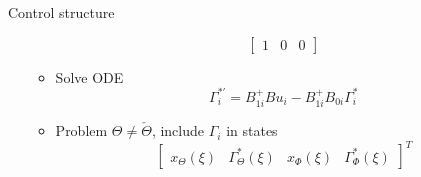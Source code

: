 \documentclass{beamer}
\begin{document}
\begin{frame}{Control structure}
\begin{itemize}
\begin{itemize}
\begin{equation*}
\begin{bmatrix}
1 & 0 & 0
\end{bmatrix}
\end{equation*}
\item Solve ODE 
\begin{equation*}
\Gamma_i^{*'} = B_{1i}^+ B u_i - B_{1i}^+ B_{0i} \Gamma_i^*
\end{equation*}
\item Problem $\Theta \ne \check{\Theta}$, include $\Gamma_i$ in states
\begin{equation*}
			\begin{bmatrix}
			x_\Theta(\xi) &
			\Gamma_\Theta^{*}(\xi) &
			x_\Phi(\xi) &
			\Gamma_\Phi^{*} (\xi)
			\end{bmatrix}^T
\end{equation*}
\end{itemize}

\end{itemize}
\end{frame}
\end{document}
